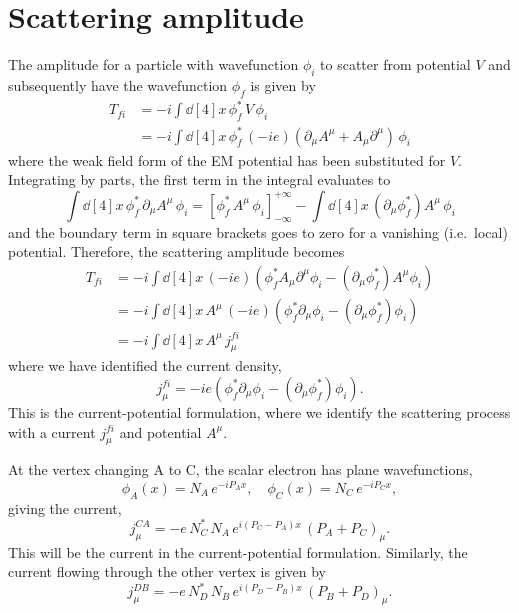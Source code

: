 \documentclass{report}
\begin{document}
\section{Scattering amplitude}
The amplitude for a particle with wavefunction $\phi_i$ to scatter from potential $V$ and subsequently have the wavefunction $\phi_f$ is given by
\begin{align}
T_{fi} &= -i \int \dd[4]{x} \, \phi_f^* \, V \, \phi_i \\
&= -i \int \dd[4]{x} \, \phi_f^* \, (-ie) \left( \partial_\mu A^\mu + A_\mu\partial^\mu \right) \, \phi_i
\end{align}
where the weak field form of the EM potential has been substituted for $V$. Integrating by parts, the first term in the integral evaluates to
\begin{equation}
\int \dd[4]{x} \, \phi_f^* \, \partial_\mu A^\mu \, \phi_i = \left[ \phi_f^* \, A^\mu \, \phi_i \right]_{-\infty}^{+\infty} - \int \dd[4]{x} \, \left( \partial_\mu \phi_f^* \right) A^\mu \, \phi_i
\end{equation}
and the boundary term in square brackets goes to zero for a vanishing (i.e.~local) potential. Therefore, the scattering amplitude becomes
\begin{align}
T_{fi} &= -i \int \dd[4]{x} \,(-ie)\left( \phi_f^* A_\mu \partial^\mu \phi_i - (\partial_\mu \phi_f^*) A^\mu \phi_i \right) \nonumber \\
&= -i \int \dd[4]{x} \, A^\mu \,(-ie)\left( \phi_f^* \partial_\mu \phi_i - (\partial_\mu \phi_f^*) \phi_i \right) \nonumber \\
&= -i \int \dd[4]{x} \, A^\mu \, j_\mu^{fi} \label{eq:scatterAmp}
\end{align}
where we have identified the current density,
\begin{equation}
j_\mu^{fi} = -ie \left( \phi_f^* \partial_\mu \phi_i - (\partial_\mu \phi_f^*) \phi_i \right).
\end{equation}
This is the current-potential formulation, where we identify the scattering process with a current $j_\mu^{fi}$ and potential $A^\mu$.

At the vertex changing A to C, the scalar electron has plane wavefunctions,
\begin{equation}
\phi_A(x) = N_A \, e^{-iP_Ax}, \quad \phi_C(x) = N_C \, e^{-iP_Cx},
\end{equation}
giving the current,
\begin{equation}
j_\mu^{CA} = -e \, N_C^* \, N_A \, e^{i(P_C-P_A)x} \, (P_A + P_C)_\mu. \label{eq:current}
\end{equation}
This will be the current in the current-potential formulation. Similarly, the current flowing through the other vertex is given by
\begin{equation}
j_\mu^{DB} = -e \, N_D^* \, N_B \, e^{i(P_D-P_B)x} \, (P_B + P_D)_\mu.
\end{equation}
\end{document}
